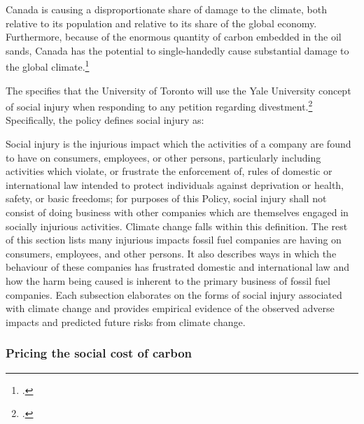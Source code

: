 \documentclass[10pt]{article}
\newenvironment{itquote}{%
  \quote
  \itshape
}{%
  \endquote
}
\begin{document}
Canada is causing a disproportionate share of damage to the climate, both relative to its population and relative to its share of the global economy.
Furthermore, because of the enormous quantity of carbon embedded in the oil sands, Canada has the potential to single-handedly cause substantial damage to the global climate.\footcite[][]{IrrevocablyTar}



The  specifies that the University of Toronto will use the Yale University concept of social injury when responding to any petition regarding divestment.\footcite[See also: ][]{EthicalInvestor}
Specifically, the policy defines social injury as:
\begin{itquote}
Social injury is the injurious impact which the activities of a company are found to have on consumers, employees, or other persons, particularly including activities which violate, or frustrate the enforcement of, rules of domestic or international law intended to protect individuals against deprivation or health, safety, or basic freedoms; for purposes of this Policy, social injury shall not consist of doing business with other companies which are themselves engaged in socially injurious activities.
\end{itquote}
Climate change falls within this definition.
The rest of this section lists many injurious impacts fossil fuel companies are having on consumers, employees, and other persons.
It also describes ways in which the behaviour of these companies has frustrated domestic and international law and how the harm being caused is inherent to the primary business of fossil fuel companies.
Each subsection elaborates on the forms of social injury associated with climate change and provides empirical evidence of the observed adverse impacts and predicted future risks from climate change.



	\subsubsection{Pricing the social cost of carbon}
	\label{sec:PricingSocialCost}
\end{document}
